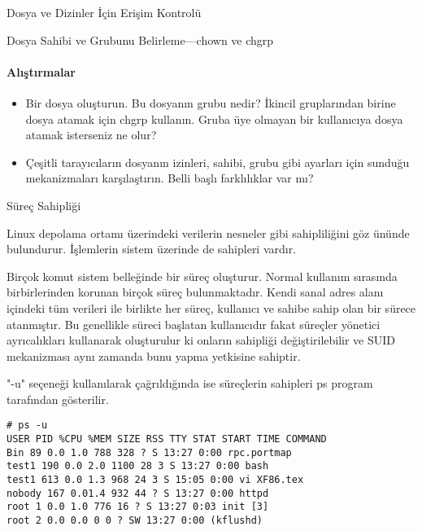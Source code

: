 \begin{section}{Dosya ve Dizinler İçin Erişim Kontrolü}
\begin{subsection}{Dosya Sahibi ve Grubunu Belirleme—chown ve chgrp}
\paragraph{Alıştırmalar}{
\begin{itemize}
 \item Bir dosya oluşturun. Bu dosyanın grubu nedir? İkincil gruplarından birine dosya atamak için chgrp kullanın. Gruba üye olmayan bir kullanıcıya dosya atamak isterseniz ne olur?
 \item Çeşitli tarayıcıların dosyanın izinleri, sahibi, grubu gibi ayarları için sunduğu mekanizmaları karşılaştırın. Belli başlı farklılıklar var mı?
 \end{itemize}}
\end{subsection}
\end{section}
\begin{section}{Süreç Sahipliği}

Linux depolama ortamı üzerindeki verilerin nesneler gibi sahipliliğini göz ününde bulundurur. İşlemlerin sistem üzerinde de sahipleri vardır.

Birçok komut sistem belleğinde bir süreç oluşturur. Normal kullanım sırasında birbirlerinden korunan birçok süreç bulunmaktadır. Kendi sanal adres alanı içindeki tüm verileri ile birlikte her süreç, kullanıcı ve sahibe sahip olan bir sürece atanmıştır. Bu genellikle süreci başlatan kullanıcıdır fakat süreçler yönetici ayrıcalıkları kullanarak oluşturulur ki onların sahipliği değiştirilebilir ve SUID mekanizması aynı zamanda bunu yapma yetkisine sahiptir.
 
"-u" seçeneği kullanılarak çağrıldığında ise süreçlerin sahipleri ps program tarafından gösterilir.
\begin{verbatim}
# ps -u
USER PID %CPU %MEM SIZE RSS TTY STAT START TIME COMMAND
Bin 89 0.0 1.0 788 328 ? S 13:27 0:00 rpc.portmap
test1 190 0.0 2.0 1100 28 3 S 13:27 0:00 bash
test1 613 0.0 1.3 968 24 3 S 15:05 0:00 vi XF86.tex
nobody 167 0.01.4 932 44 ? S 13:27 0:00 httpd
root 1 0.0 1.0 776 16 ? S 13:27 0:03 init [3]
root 2 0.0 0.0 0 0 ? SW 13:27 0:00 (kflushd)
\end{verbatim}
\end{section}
